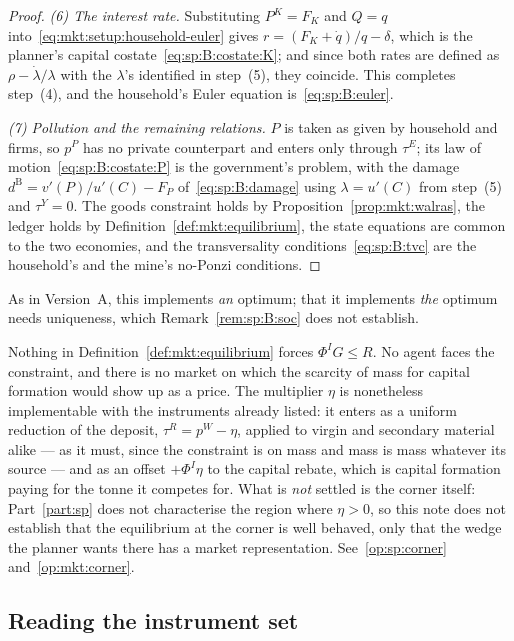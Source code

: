 \begin{proof}
\emph{(6) The interest rate.} Substituting $P^K=F_K$ and $Q=q$
into~\eqref{eq:mkt:setup:household-euler} gives $r=\left(F_K+\dot q\right)/q-\delta$, which is the
planner's capital costate~\eqref{eq:sp:B:costate:K}; and since both rates are defined as
$\rho-\dot\lambda/\lambda$ with the $\lambda$'s identified in step~(5), they coincide. This completes
step~(4), and the household's Euler equation is~\eqref{eq:sp:B:euler}.

\emph{(7) Pollution and the remaining relations.} $P$ is taken as given by household and firms, so
$p^P$ has no private counterpart and enters only through $\tau^E$; its law of
motion~\eqref{eq:sp:B:costate:P} is the government's problem, with the damage
$d^{\mathrm B}=v'(P)/u'(C)-F_P$ of~\eqref{eq:sp:B:damage} using $\lambda=u'(C)$ from step~(5) and $\tau^Y=0$. The
goods constraint holds by Proposition~\ref{prop:mkt:walras}, the ledger holds by
Definition~\ref{def:mkt:equilibrium}, the state equations are common to the two economies, and the
transversality conditions~\eqref{eq:sp:B:tvc} are the household's and the mine's no-Ponzi conditions.
\end{proof}

As in Version~A, this implements \emph{an} optimum; that it implements \emph{the} optimum needs
uniqueness, which Remark~\ref{rem:sp:B:soc} does not establish.

\begin{remark}\label{rem:mkt:B:eta}
Nothing in Definition~\ref{def:mkt:equilibrium} forces $\Phi^IG\le R$. No agent faces the constraint,
and there is no market on which the scarcity of mass for capital formation would show up as a price.
The multiplier $\eta$ is nonetheless implementable with the instruments already listed: it enters as a
uniform reduction of the deposit, $\tau^R=p^W-\eta$, applied to virgin and secondary material alike ---
as it must, since the constraint is on mass and mass is mass whatever its source --- and as an offset
$+\Phi^I\eta$ to the capital rebate, which is capital formation paying for the tonne it competes for.
What is \emph{not} settled is the corner itself: Part~\ref{part:sp} does not characterise the region
where $\eta>0$, so this note does not establish that the equilibrium at the corner is well behaved,
only that the wedge the planner wants there has a market representation. See~\ref{op:sp:corner}
and~\ref{op:mkt:corner}.
\end{remark}


\subsection{Reading the instrument set}\label{sec:mkt:B:reading}

